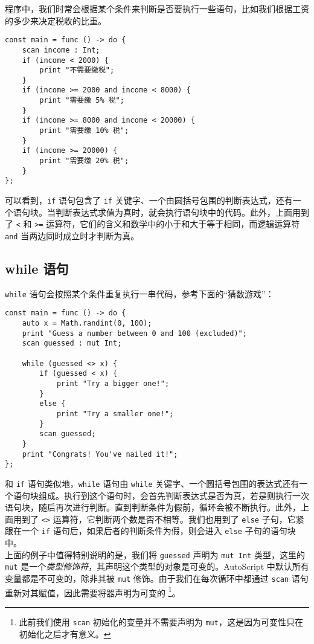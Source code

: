 程序中，我们时常会根据某个条件来判断是否要执行一些语句，比如我们根据工资的多少来决定税收的比重。

\begin{lstlisting}
const main = func () -> do {
    scan income : Int;
    if (income < 2000) {
        print "不需要缴税";
    }
    if (income >= 2000 and income < 8000) {
        print "需要缴 5% 税";
    }
    if (income >= 8000 and income < 20000) {
        print "需要缴 10% 税";
    }
    if (income >= 20000) {
        print "需要缴 20% 税";
    }
};
\end{lstlisting}

可以看到，\lstinline!if! 语句包含了 \lstinline!if! 关键字、一个由圆括号包围的判断表达式，还有一个语句块。当判断表达式求值为真时，就会执行语句块中的代码。此外，上面用到了 \lstinline!<! 和 \lstinline!>=! 运算符，它们的含义和数学中的小于和大于等于相同，而逻辑运算符 \lstinline!and! 当两边同时成立时才判断为真。


\subsection{while 语句}

\lstinline!while! 语句会按照某个条件重复执行一串代码，参考下面的“猜数游戏”：

\begin{lstlisting}
const main = func () -> do {
    auto x = Math.randint(0, 100);
    print "Guess a number between 0 and 100 (excluded)";
    scan guessed : mut Int;

    while (guessed <> x) {
        if (guessed < x) {
            print "Try a bigger one!";
        }
        else {
            print "Try a smaller one!";
        }
        scan guessed;
    }
    print "Congrats! You've nailed it!";
};
\end{lstlisting}

和 \lstinline!if! 语句类似地，\lstinline!while! 语句由 \lstinline!while! 关键字、一个圆括号包围的表达式还有一个语句块组成。执行到这个语句时，会首先判断表达式是否为真，若是则执行一次语句块，随后再次进行判断。直到判断条件为假前，循环会被不断执行。此外，上面用到了 \lstinline!<>! 运算符，它判断两个数是否不相等。我们也用到了 \lstinline!else! 子句，它紧跟在一个 \lstinline!if! 语句后，如果后者的判断条件为假，则会进入 \lstinline!else! 子句的语句块中。 \\

上面的例子中值得特别说明的是，我们将 \lstinline!guessed! 声明为 \lstinline!mut Int! 类型，这里的 \lstinline!mut! 是一个\emph{类型修饰符}，其声明这个类型的对象是可变的。AutoScript 中默认所有变量都是不可变的，除非其被 \lstinline!mut! 修饰。由于我们在每次循环中都通过 \lstinline!scan! 语句重新对其赋值，因此需要将器声明为可变的 \footnote{此前我们使用 \lstinline!scan! 初始化的变量并不需要声明为 \lstinline!mut!，这是因为可变性只在初始化之后才有意义。}。

